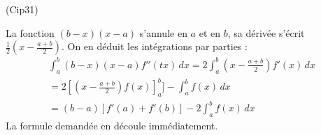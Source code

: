 \begin{tiny}(Cip31)\end{tiny} La fonction $(b-x)(x-a)$ s'annule en $a$ et en $b$, sa dérivée s'écrit $\frac{1}{2}(x-\frac{a+b}{2})$. On en déduit les intégrations par parties :
\begin{multline*}
\int_{a}^{b}(b-x)(x-a)f''(tx)\,dx = 2\int_{a}^{b}(x-\frac{a+b}{2})f'(x)\,dx\\
 = 2[(x-\frac{a+b}{2})f(x)]_{a}^{b}]-\int_{a}^{b}f(x)\,dx\\
 = (b-a)[f'(a)+f'(b)]-2\int_{a}^{b}f(x)\,dx
\end{multline*}
La formule demandée en découle immédiatement.
